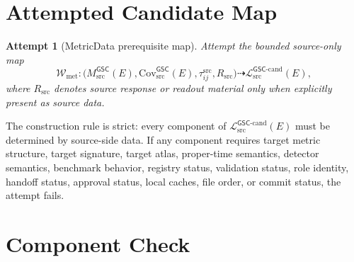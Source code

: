 \documentclass[11pt]{article}
\newcommand{\MsrcGSC}{M_{\mathrm{src}}^{\mathsf{GSC}}}
\newcommand{\MetricDataCand}{\mathcal{L}_{\mathrm{src}}^{\mathsf{GSC}\mbox{-}\mathrm{cand}}}
\newtheorem{attempt}{Attempt}
\begin{document}
\section{Attempted Candidate Map}

\begin{attempt}[MetricData prerequisite map]
Attempt the bounded source-only map
\[
  \mathcal{W}_{\mathrm{met}}:
  \bigl(
    \MsrcGSC(E),
    \mathrm{Cov}_{\mathrm{src}}^{\mathsf{GSC}}(E),
    \tau_{ij}^{\mathrm{src}},
    R_{\mathrm{src}}
  \bigr)
  \dashrightarrow
  \MetricDataCand(E),
\]
where \(R_{\mathrm{src}}\) denotes source response or readout material only
when explicitly present as source data.
\end{attempt}

The construction rule is strict: every component of \(\MetricDataCand(E)\)
must be determined by source-side data. If any component requires target
metric structure, target signature, target atlas, proper-time semantics,
detector semantics, benchmark behavior, registry status, validation status,
role identity, handoff status, approval status, local caches, file order, or
commit status, the attempt fails.

\section{Component Check}
\end{document}
